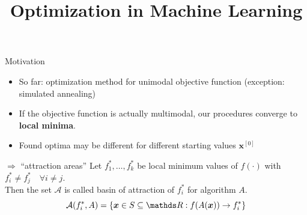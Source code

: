 \documentclass[11pt,compress,t,notes=noshow, xcolor=table]{beamer}
\title{Optimization in Machine Learning}
\date{}
\begin{document}
\sloppy


\begin{vbframe}{Motivation}
\begin{itemize}
\item So far: optimization method for unimodal objective function (exception: simulated annealing)
\item If the objective function is actually multimodal, our procedures converge to \textbf{local minima}.
\item Found optima may be different for different starting values $\bm{x}^{[0]}$
\end{itemize}
\begin{block}{$\Rightarrow$ \enquote{attraction areas}}
Let $f_1^*, \ldots, f_k^*$ be local minimum values of $f(\cdot)$
with $f_i^* \neq f_j^* \quad \forall i \neq j$. \\
Then the set $\mathcal{A}$ is called basin of attraction of $f_i^*$ for algorithm $A$.
$$
\mathcal{A}(f_i^*, A) = \left\{ \bm{x} \in S \subseteq \R : f(A(\bm{x}))
\rightarrow f_i^*\right\}
$$

\end{block}
\end{vbframe}
\end{document}
